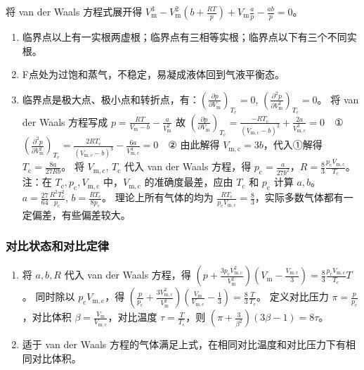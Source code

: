 将 van der Waals 方程式展开得 $V_{\mathrm{m}}^3 - V_{\mathrm{m}}^2 \left(b + \frac{RT}{p}\right) + V_{\mathrm{m}} \frac{a}{p} - \frac{ab}{p} = 0$。
\begin{enumerate}
    \item 临界点以上有一实根两虚根；临界点有三相等实根；临界点以下有三个不同实根。
    \item F点处为过饱和蒸气，不稳定，易凝成液体回到气液平衡态。
    \item 临界点是极大点、极小点和转折点，有：$\left(\frac{\partial p}{\partial V_{\mathrm{m}}}\right)_{T_{\mathrm{c}}} = 0$, $\left(\frac{\partial^2 p}{\partial V_{\mathrm{m}}^2}\right)_{T_{\mathrm{c}}} = 0$。
    将 van der Waals 方程写成 $p = \frac{RT}{V_{\mathrm{m}} - b} - \frac{a}{V_{\mathrm{m}}^2}$
    故 $\left(\frac{\partial p}{\partial V_{\mathrm{m}}}\right)_{T_{\mathrm{c}}} = \frac{-R T_{\mathrm{c}}}{(V_{\mathrm{m,c}} - b)^2} + \frac{2a}{V_{\mathrm{m,c}}^3} = 0 \quad \text{①}$
    $\left(\frac{\partial^2 p}{\partial V_{\mathrm{m}}^2}\right)_{T_{\mathrm{c}}} = \frac{2R T_{\mathrm{c}}}{(V_{\mathrm{m,c}} - b)^3} - \frac{6a}{V_{\mathrm{m,c}}^4} = 0 \quad \text{②}$
    由此解得 $V_{\mathrm{m,c}} = 3b$，代入①解得 $T_{\mathrm{c}} = \frac{8a}{27Rb}$。
    将 $V_{\mathrm{m,c}}$, $T_{\mathrm{c}}$ 代入 van der Waals 方程，得 $p_{\mathrm{c}} = \frac{a}{27b^2}$，$R = \frac{8}{3} \frac{p_{\mathrm{c}} V_{\mathrm{m,c}}}{T_{\mathrm{c}}}$。
    注：在 $T_{\mathrm{c}}, p_{\mathrm{c}}, V_{\mathrm{m,c}}$ 中，$V_{\mathrm{m,c}}$ 的准确度最差，应由 $T_{\mathrm{c}}$ 和 $p_{\mathrm{c}}$ 计算 $a, b$。 $a = \frac{27}{64} \frac{R^2 T_{\mathrm{c}}^2}{p_{\mathrm{c}}}$, $b = \frac{R T_{\mathrm{c}}}{8 p_{\mathrm{c}}}$。
    理论上所有气体的均为 $\frac{R T_{\mathrm{c}}}{p_{\mathrm{c}} V_{\mathrm{m,c}}} = \frac83$，实际多数气体都有一定偏差，有些偏差较大。
\end{enumerate}

\subsubsection{对比状态和对比定律}

\begin{enumerate}
    \item 将 $a, b, R$ 代入 van der Waals 方程，得 $\left(p + \frac{3 p_{\mathrm{c}} V_{\mathrm{m,c}}^2}{V_{\mathrm{m}}^2}\right) \left(V_{\mathrm{m}} - \frac{V_{\mathrm{m,c}}}{3}\right) = \frac{8}{3} \frac{p_{\mathrm{c}} V_{\mathrm{m,c}}}{T_{\mathrm{c}}} T$。
    同时除以 $p_{\mathrm{c}} V_{\mathrm{m,c}}$，得 $\left(\frac{p}{p_{\mathrm{c}}} + \frac{3 V_{\mathrm{m,c}}^2}{V_{\mathrm{m}}^2}\right) \left(\frac{V_{\mathrm{m}}}{V_{\mathrm{m,c}}} - \frac{1}{3}\right) = \frac{8}{3} \frac{T}{T_{\mathrm{c}}}$。
    定义对比压力 $\pi = \frac{p}{p_{\mathrm{c}}}$，对比体积 $\beta = \frac{V_{\mathrm{m}}}{V_{\mathrm{m,c}}}$，对比温度 $\tau = \frac{T}{T_{\mathrm{c}}}$，则 $\left(\pi + \frac{3}{\beta^2}\right) \left(3\beta - 1\right) = 8\tau$。
    \item 适于 van der Waals 方程的气体满足上式，在相同对比温度和对比压力下有相同对比体积。
\end{enumerate}

